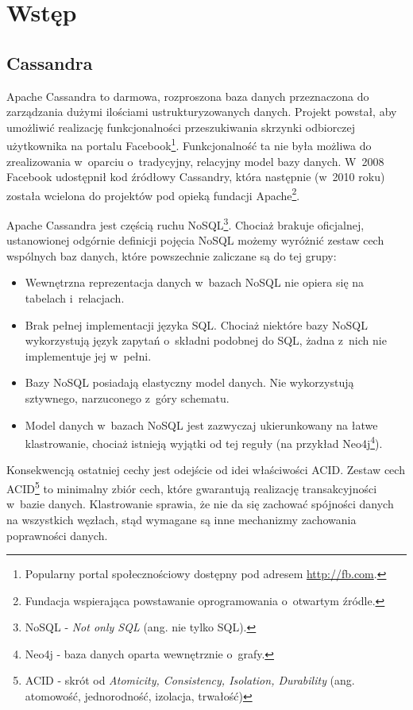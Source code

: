 \documentclass{report}
\begin{document}
\chapter{Wstęp}

\section{Cassandra}

Apache Cassandra to darmowa, rozproszona baza danych przeznaczona do zarządzania dużymi ilościami ustrukturyzowanych danych. Projekt powstał, aby umożliwić realizację funkcjonalności przeszukiwania skrzynki odbiorczej użytkownika na portalu Facebook\footnote{Popularny portal społecznościowy dostępny pod adresem \url{http://fb.com}.}. Funkcjonalność ta nie była możliwa do zrealizowania w~oparciu o~tradycyjny, relacyjny model bazy danych. W~2008 Facebook udostępnił kod źródłowy Cassandry, która następnie (w~2010 roku) została wcielona do projektów pod opieką fundacji Apache\footnote{Fundacja wspierająca powstawanie oprogramowania o~otwartym źródle.}.\cite{casshistory} 

Apache Cassandra jest częścią ruchu NoSQL\footnote{NoSQL - \emph{Not only SQL} (ang. nie tylko SQL).}. Chociaż brakuje oficjalnej, ustanowionej odgórnie definicji pojęcia NoSQL możemy wyróżnić zestaw cech wspólnych baz danych, które powszechnie zaliczane są do tej grupy:

\begin{itemize}
	\item Wewnętrzna reprezentacja danych w~bazach NoSQL nie opiera się na tabelach i~relacjach.
	\item Brak pełnej implementacji języka SQL. Chociaż niektóre bazy NoSQL wykorzystują język zapytań o~składni podobnej do SQL, żadna z~nich nie implementuje jej w~pełni.
	\item Bazy NoSQL posiadają elastyczny model danych. Nie wykorzystują sztywnego, narzuconego z~góry schematu.
	\item Model danych w~bazach NoSQL jest zazwyczaj ukierunkowany na łatwe klastrowanie, chociaż istnieją wyjątki od tej reguły (na przykład Neo4j\footnote{Neo4j - baza danych oparta wewnętrznie o~grafy.}). \cite{nosqldistilled}
\end{itemize}

Konsekwencją ostatniej cechy jest odejście od idei właściwości ACID. Zestaw cech ACID\footnote{ACID - skrót od \emph{Atomicity, Consistency, Isolation, Durability} (ang. atomowość, jednorodność, izolacja, trwałość)} to minimalny zbiór cech, które gwarantują realizację transakcyjności w~bazie danych. \cite{transactionconcept} Klastrowanie sprawia, że nie da się zachować spójności danych na wszystkich węzłach, stąd wymagane są inne mechanizmy zachowania poprawności danych.

\printbibliography
\end{document}
